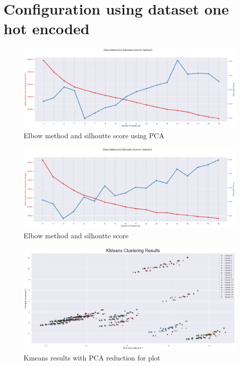 \documentclass[12pt,a4paper,twoside]{article}
\begin{document}
\newpage

\section*{Configuration using dataset one hot encoded}

\begin{figure}[!ht]
    \centering
    \includegraphics[width=\textwidth,height=\textheight,keepaspectratio]{assets/elbow-one-hot-pca.png}
    \caption{Elbow method and silhoutte score using PCA}
    \label{fig:}
\end{figure}

\begin{figure}[!ht]
    \centering
    \includegraphics[width=\textwidth,height=\textheight,keepaspectratio]{assets/elbow-one-hot.png}
    \caption{Elbow method and silhoutte score}
    \label{fig:}
\end{figure}

\begin{figure}[!ht]
    \centering
    \includegraphics[width=\textwidth,height=\textheight,keepaspectratio]{assets/kmeans-one-hot.png}
    \caption{Kmeans results with PCA reduction for plot}
    \label{fig:}
\end{figure}
\end{document}
